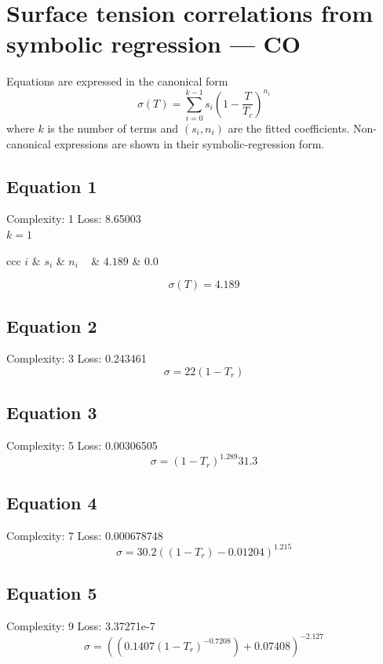 \documentclass[11pt]{article}
\begin{document}
\section*{Surface tension correlations from symbolic regression — CO}
\noindent Equations are expressed in the canonical form
\[
  \sigma(T) = \sum_{i=0}^{k-1} s_i \left(1 - \frac{T}{T_c}\right)^{\!n_i}
\]
where $k$ is the number of terms and $(s_i, n_i)$ are the fitted coefficients.
Non-canonical expressions are shown in their symbolic-regression form.

\subsection*{Equation 1}
\noindent Complexity: 1 \quad Loss: 8.65003 \\[4pt]
\noindent $k = 1$ \\[2pt]
\begin{center}
\begin{tabular}{ccc}
\toprule
$i$ & $s_i$ & $n_i$ \
 & $4.189$ & $0.0$ \\
\bottomrule
\end{tabular}
\end{center}
\[
\sigma(T) = 4.189
\]

\subsection*{Equation 2}
\noindent Complexity: 3 \quad Loss: 0.243461 \\[4pt]
\[
\sigma = 22 (1 - T_r)
\]

\subsection*{Equation 3}
\noindent Complexity: 5 \quad Loss: 0.00306505 \\[4pt]
\[
\sigma = \left(1 - T_r\right)^{1.289} 31.3
\]

\subsection*{Equation 4}
\noindent Complexity: 7 \quad Loss: 0.000678748 \\[4pt]
\[
\sigma = 30.2 \left((1 - T_r) - 0.01204\right)^{1.215}
\]

\subsection*{Equation 5}
\noindent Complexity: 9 \quad Loss: 3.37271e-7 \\[4pt]
\[
\sigma = \left((0.1407 \left(1 - T_r\right)^{-0.7208}) + 0.07408\right)^{-2.127}
\]
\end{document}
